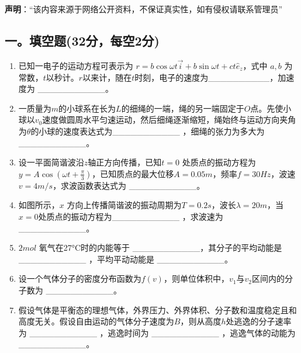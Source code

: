 
\textbf{声明}：“该内容来源于网络公开资料，不保证真实性，如有侵权请联系管理员”

\subsection{一。填空题(32分，每空2分)}
\begin{enumerate}
    \item 已知一电子的运动方程可表示为 $r = b \cos \omega t\vec{i} + b \sin \omega t + ct\hat{e}_z$，式中 $a,b$ 为常数，$t$以秒计。$r$以来计，随在$t$时刻，电子的速度为__________，加速度为 ___________。
    \item 一质量为$m$的小球系在长为$L$的细绳的一端，绳的另一端固定于$O$点。先使小球以$v_0$速度做圆周水平匀速运动，然后细绳逐渐缩短，绳始终与运动方向夹角为$\theta$的小球的速度表达式为___________ ，细绳的张力为多大为 ___________。
    \item 设一平面简谐波沿$z$轴正方向传播，已知$t = 0$ 处质点的振动方程为$y = A \cos (\omega t + \frac{\pi}{3})$，已知质点的最大位移$A=0.05m$，频率$f=30Hz$，波速$v=4m/s$，求波函数表达式为 ___________。
    \item 如图所示，$x$ 方向上传播简谐波的振动周期为$T = 0.2s$，波长$\lambda = 20m$，当$x = 0$处质点的振动方程为___________ ，求波速为 ___________。
    \item $2 mol$ 氧气在27°C时的内能等于 ___________，其分子的平均动能是 ___________ ，平均平动动能是 ___________。
    \item 设一个气体分子的密度分布函数为$f(v)$，则单位体积中，$v_1$与$v_2$区间内的分子数为 ___________。
    \item 假设气体是平衡态的理想气体，外界压力、外界体积、分子数和温度稳定且和高度无关。假设自由运动的气体分子速度为$B$，则从高度$h$处逃逸的分子速率为 ___________ ，逃逸时间为 ___________ ，逃逸气体的动能为 ___________。
\end{enumerate}
